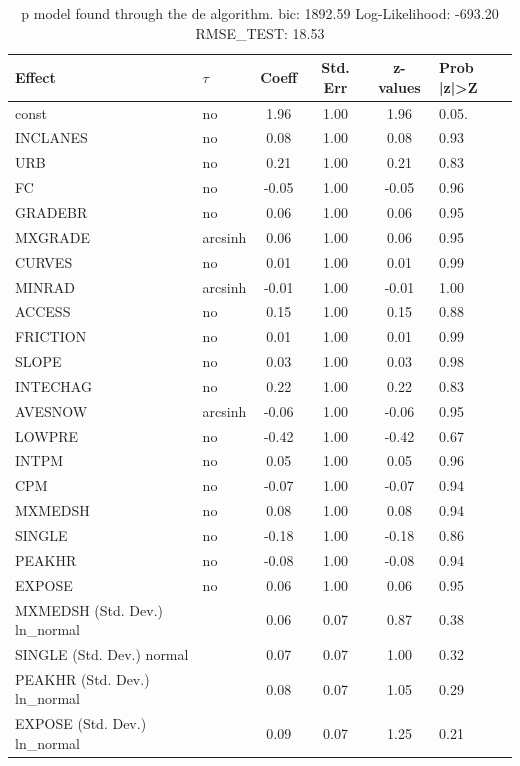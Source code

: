 \begin{table}
	\caption{p model found through the de algorithm. bic: 1892.59 Log-Likelihood: -693.20 RMSE_TEST: 18.53}
	\begin{center}
		\begin{tabular}{|l|l|c|c|c|l|}
			\hline
			Effect & $\tau$ & Coeff & Std. Err & z-values & Prob |z|>Z \\
			\hline
			const & no & 1.96 & 1.00 & 1.96 & 0.05. \\
			\hline
			INCLANES & no & 0.08 & 1.00 & 0.08 & 0.93 \\
			\hline
			URB & no & 0.21 & 1.00 & 0.21 & 0.83 \\
			\hline
			FC & no & -0.05 & 1.00 & -0.05 & 0.96 \\
			\hline
			GRADEBR & no & 0.06 & 1.00 & 0.06 & 0.95 \\
			\hline
			MXGRADE & arcsinh & 0.06 & 1.00 & 0.06 & 0.95 \\
			\hline
			CURVES & no & 0.01 & 1.00 & 0.01 & 0.99 \\
			\hline
			MINRAD & arcsinh & -0.01 & 1.00 & -0.01 & 1.00 \\
			\hline
			ACCESS & no & 0.15 & 1.00 & 0.15 & 0.88 \\
			\hline
			FRICTION & no & 0.01 & 1.00 & 0.01 & 0.99 \\
			\hline
			SLOPE & no & 0.03 & 1.00 & 0.03 & 0.98 \\
			\hline
			INTECHAG & no & 0.22 & 1.00 & 0.22 & 0.83 \\
			\hline
			AVESNOW & arcsinh & -0.06 & 1.00 & -0.06 & 0.95 \\
			\hline
			LOWPRE & no & -0.42 & 1.00 & -0.42 & 0.67 \\
			\hline
			INTPM & no & 0.05 & 1.00 & 0.05 & 0.96 \\
			\hline
			CPM & no & -0.07 & 1.00 & -0.07 & 0.94 \\
			\hline
			MXMEDSH & no & 0.08 & 1.00 & 0.08 & 0.94 \\
			\hline
			SINGLE & no & -0.18 & 1.00 & -0.18 & 0.86 \\
			\hline
			PEAKHR & no & -0.08 & 1.00 & -0.08 & 0.94 \\
			\hline
			EXPOSE & no & 0.06 & 1.00 & 0.06 & 0.95 \\
			\hline
			MXMEDSH (Std. Dev.) ln_normal &  & 0.06 & 0.07 & 0.87 & 0.38 \\
			\hline
			SINGLE (Std. Dev.) normal &  & 0.07 & 0.07 & 1.00 & 0.32 \\
			\hline
			PEAKHR (Std. Dev.) ln_normal &  & 0.08 & 0.07 & 1.05 & 0.29 \\
			\hline
			EXPOSE (Std. Dev.) ln_normal &  & 0.09 & 0.07 & 1.25 & 0.21 \\
			\hline
		\end{tabular}
	\end{center}
\end{table}